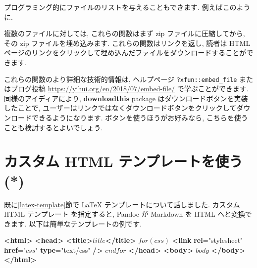 \documentclass[
  11pt,
  lualatex,ja=standard,jafont=noto]{bxjsreport}
\newenvironment{Shaded}{\begin{snugshade}}{\end{snugshade}}
\newcommand{\CommentTok}[1]{\textcolor[rgb]{0.56,0.35,0.01}{\textit{#1}}}
\newcommand{\ErrorTok}[1]{\textcolor[rgb]{0.64,0.00,0.00}{\textbf{#1}}}
\newcommand{\FunctionTok}[1]{\textcolor[rgb]{0.00,0.00,0.00}{#1}}
\newcommand{\KeywordTok}[1]{\textcolor[rgb]{0.13,0.29,0.53}{\textbf{#1}}}
\newcommand{\NormalTok}[1]{#1}
\newcommand{\OtherTok}[1]{\textcolor[rgb]{0.56,0.35,0.01}{#1}}
\newcommand{\SpecialCharTok}[1]{\textcolor[rgb]{0.00,0.00,0.00}{#1}}
\newcommand{\StringTok}[1]{\textcolor[rgb]{0.31,0.60,0.02}{#1}}
\begin{document}
プログラミング的にファイルのリストを与えることもできます. 例えばこのように.

\begin{Shaded}
\end{Shaded}

複数のファイルに対しては, これらの関数はまず zip ファイルに圧縮してから, その zip ファイルを埋め込みます. これらの関数はリンクを返し, 読者は HTML ページのリンクをクリックして埋め込んだファイルをダウンロードすることができます.

これらの関数のより詳細な技術的情報は, ヘルプページ \texttt{?xfun::embed\_file} またはブログ投稿 \url{https://yihui.org/en/2018/07/embed-file/} で学ぶことができます. 同様のアイディアにより, \textbf{downloadthis} package \autocite{R-downloadthis} はダウンロードボタンを実装したことで, ユーザーはリンクではなくダウンロードボタンをクリックしてダウンロードできるようになります. ボタンを使うほうがお好みなら, こちらを使うことも検討するとよいでしょう.

\hypertarget{html-template}{%
\section{カスタム HTML テンプレートを使う (*)}\label{html-template}}

既に\ref{latex-template}節で LaTeX テンプレートについて話しました. カスタム HTML テンプレート を指定すると, Pandoc が Markdown を HTML へと変換できます. 以下は簡単なテンプレートの例です.

\begin{Shaded}
\begin{Highlighting}[]
\KeywordTok{\textless{}html\textgreater{}}
  \KeywordTok{\textless{}head\textgreater{}}
    \KeywordTok{\textless{}title\textgreater{}}\NormalTok{$title$}\KeywordTok{\textless{}/title\textgreater{}}
\NormalTok{    $for(css)$}
    \KeywordTok{\textless{}link} \ErrorTok{rel}\OtherTok{=}\StringTok{"stylesheet"} \ErrorTok{href}\OtherTok{=}\StringTok{"$css$"} \ErrorTok{type}\OtherTok{=}\StringTok{"text/css"} \KeywordTok{/\textgreater{}}
\NormalTok{    $endfor$}
  \KeywordTok{\textless{}/head\textgreater{}}
  \KeywordTok{\textless{}body\textgreater{}}
\NormalTok{  $body$}
  \KeywordTok{\textless{}/body\textgreater{}}
\KeywordTok{\textless{}/html\textgreater{}}
\end{Highlighting}
\end{Shaded}
\end{document}
